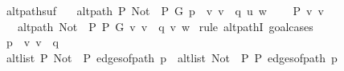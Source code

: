 \begin{isabellebody}
\isamarkupfalse%
%
\endisatagproof
{\isafoldproof}%
%
\isadelimproof
\isanewline
%
\endisadelimproof
\isanewline
{}\isamarkupfalse%
\ alt{\isacharunderscore}{\kern0pt}path{\isacharunderscore}{\kern0pt}suf{\isacharunderscore}{\kern0pt}{}{\isacharcolon}{\kern0pt}\isanewline
\ \ \ {\isachardoublequoteopen}alt{\isacharunderscore}{\kern0pt}path\ P\ {\isacharparenleft}{\kern0pt}Not\ {\isasymcirc}\ P{\isacharparenright}{\kern0pt}\ G\ {\isacharparenleft}{\kern0pt}p\ {\isacharat}{\kern0pt}\ {\isacharbrackleft}{\kern0pt}v{\isacharcomma}{\kern0pt}\ v{\isacharprime}{\kern0pt}{\isacharbrackright}{\kern0pt}\ {\isacharat}{\kern0pt}\ q{\isacharparenright}{\kern0pt}\ u\ w{\isachardoublequoteclose}\isanewline
\ \ \ {\isachardoublequoteopen}{\isasymnot}\ P\ {\isacharbraceleft}{\kern0pt}v{\isacharcomma}{\kern0pt}\ v{\isacharprime}{\kern0pt}{\isacharbraceright}{\kern0pt}{\isachardoublequoteclose}\isanewline
\ \ \ {\isachardoublequoteopen}alt{\isacharunderscore}{\kern0pt}path\ {\isacharparenleft}{\kern0pt}Not\ {\isasymcirc}\ P{\isacharparenright}{\kern0pt}\ P\ G\ {\isacharparenleft}{\kern0pt}{\isacharbrackleft}{\kern0pt}v{\isacharcomma}{\kern0pt}\ v{\isacharprime}{\kern0pt}{\isacharbrackright}{\kern0pt}\ {\isacharat}{\kern0pt}\ q{\isacharparenright}{\kern0pt}\ v\ w{\isachardoublequoteclose}\isanewline
%
\isadelimproof
%
\endisadelimproof
%
\isatagproof
{}\isamarkupfalse%
\ {\isacharparenleft}{\kern0pt}rule\ alt{\isacharunderscore}{\kern0pt}pathI{\isacharcomma}{\kern0pt}\ goal{\isacharunderscore}{\kern0pt}cases{\isacharparenright}{\kern0pt}\isanewline
\ \ \isamarkupfalse%
\ {}\isanewline
\ \ \isamarkupfalse%
\ {\isacharquery}{\kern0pt}p{\isacharprime}{\kern0pt}\ {\isacharequal}{\kern0pt}\ {\isachardoublequoteopen}{\isacharbrackleft}{\kern0pt}v{\isacharcomma}{\kern0pt}\ v{\isacharprime}{\kern0pt}{\isacharbrackright}{\kern0pt}\ {\isacharat}{\kern0pt}\ q{\isachardoublequoteclose}\isanewline
\ \ \isamarkupfalse%
\ {\isachardoublequoteopen}alt{\isacharunderscore}{\kern0pt}list\ P\ {\isacharparenleft}{\kern0pt}Not\ {\isasymcirc}\ P{\isacharparenright}{\kern0pt}\ {\isacharparenleft}{\kern0pt}edges{\isacharunderscore}{\kern0pt}of{\isacharunderscore}{\kern0pt}path\ {\isacharquery}{\kern0pt}p{\isacharprime}{\kern0pt}{\isacharparenright}{\kern0pt}\ {\isasymor}\ alt{\isacharunderscore}{\kern0pt}list\ {\isacharparenleft}{\kern0pt}Not\ {\isasymcirc}\ P{\isacharparenright}{\kern0pt}\ P\ {\isacharparenleft}{\kern0pt}edges{\isacharunderscore}{\kern0pt}of{\isacharunderscore}{\kern0pt}path\ {\isacharquery}{\kern0pt}p{\isacharprime}{\kern0pt}{\isacharparenright}{\kern0pt}{\isachardoublequoteclose}\isanewline

\end{isabellebody}
